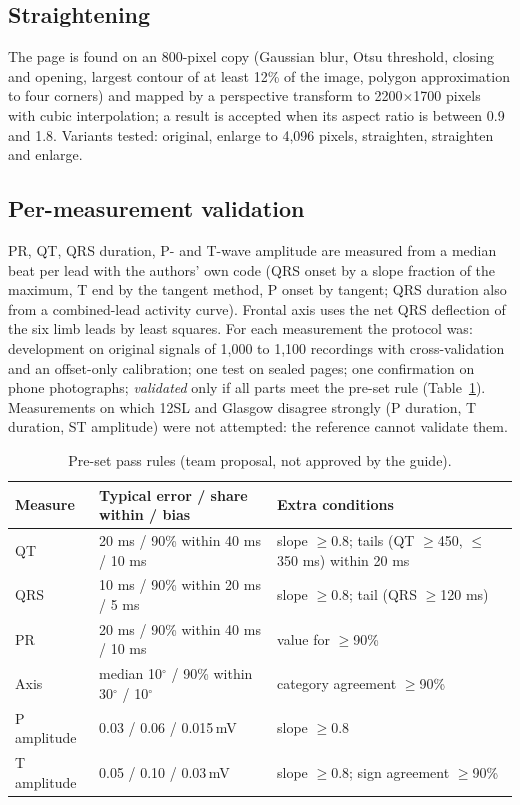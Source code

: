 \documentclass[11pt,a4paper]{article}
\newcommand{\mV}{\,mV}
\begin{document}
\subsection{Straightening}
The page is found on an 800-pixel copy (Gaussian blur, Otsu threshold, closing and opening, largest contour of at least 12\% of the image, polygon approximation to four corners) and mapped by a perspective transform to 2200$\times$1700 pixels with cubic interpolation; a result is accepted when its aspect ratio is between 0.9 and 1.8. Variants tested: original, enlarge to 4,096 pixels, straighten, straighten and enlarge.

\subsection{Per-measurement validation}
PR, QT, QRS duration, P- and T-wave amplitude are measured from a median beat per lead with the authors' own code (QRS onset by a slope fraction of the maximum, T end by the tangent method, P onset by tangent; QRS duration also from a combined-lead activity curve). Frontal axis uses the net QRS deflection of the six limb leads by least squares. For each measurement the protocol was: development on original signals of 1,000 to 1,100 recordings with cross-validation and an offset-only calibration; one test on sealed pages; one confirmation on phone photographs; \emph{validated} only if all parts meet the pre-set rule (Table~\ref{tab:rules}). Measurements on which 12SL and Glasgow disagree strongly (P duration, T duration, ST amplitude) were not attempted: the reference cannot validate them.

\begin{table}[ht]
\caption{Pre-set pass rules (team proposal, not approved by the guide).}
\label{tab:rules}
\centering\small
\begin{tabular}{p{2.4cm}p{5.4cm}p{5.2cm}}
\toprule
Measure & Typical error / share within / bias & Extra conditions \\
\midrule
QT & 20 ms / 90\% within 40 ms / 10 ms & slope $\ge$0.8; tails (QT $\ge$450, $\le$350 ms) within 20 ms \\
QRS & 10 ms / 90\% within 20 ms / 5 ms & slope $\ge$0.8; tail (QRS $\ge$120 ms) \\
PR & 20 ms / 90\% within 40 ms / 10 ms & value for $\ge$90\% \\
Axis & median 10$^\circ$ / 90\% within 30$^\circ$ / 10$^\circ$ & category agreement $\ge$90\% \\
P amplitude & 0.03 / 0.06 / 0.015\mV & slope $\ge$0.8 \\
T amplitude & 0.05 / 0.10 / 0.03\mV & slope $\ge$0.8; sign agreement $\ge$90\% \\
\bottomrule
\end{tabular}
\end{table}
\end{document}
